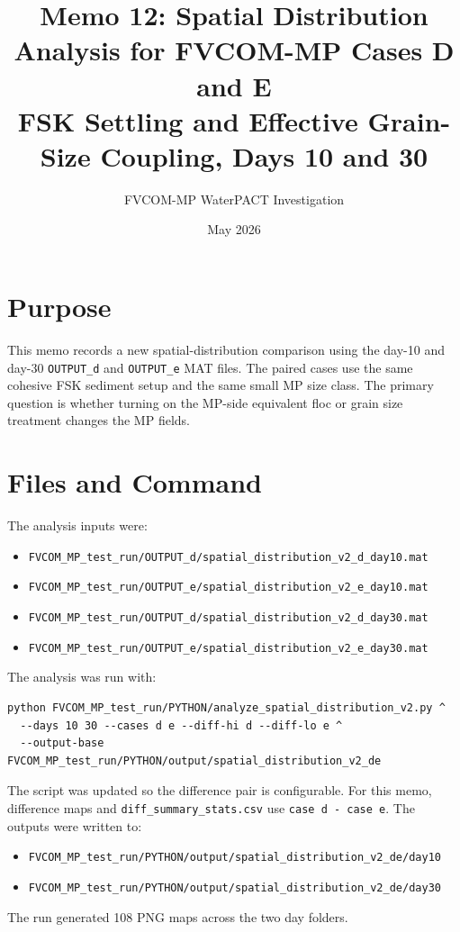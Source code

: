 \documentclass[11pt]{article}
\title{Memo 12: Spatial Distribution Analysis for FVCOM-MP Cases D and E\\
       FSK Settling and Effective Grain-Size Coupling, Days 10 and 30}
\author{FVCOM-MP WaterPACT Investigation}
\date{May 2026}
\begin{document}
\sloppy
\setlength{\tabcolsep}{4pt}
\maketitle

\section*{Purpose}

This memo records a new spatial-distribution comparison using the day-10 and
day-30 \texttt{OUTPUT\_d} and \texttt{OUTPUT\_e} MAT files.  The paired cases
use the same cohesive FSK sediment setup and the same small MP size class.  The
primary question is whether turning on the MP-side equivalent floc or grain
size treatment changes the MP fields.

\section*{Files and Command}

The analysis inputs were:
\begin{itemize}
  \item \texttt{FVCOM\_MP\_test\_run/OUTPUT\_d/spatial\_distribution\_v2\_d\_day10.mat}
  \item \texttt{FVCOM\_MP\_test\_run/OUTPUT\_e/spatial\_distribution\_v2\_e\_day10.mat}
  \item \texttt{FVCOM\_MP\_test\_run/OUTPUT\_d/spatial\_distribution\_v2\_d\_day30.mat}
  \item \texttt{FVCOM\_MP\_test\_run/OUTPUT\_e/spatial\_distribution\_v2\_e\_day30.mat}
\end{itemize}

The analysis was run with:
\begin{verbatim}
python FVCOM_MP_test_run/PYTHON/analyze_spatial_distribution_v2.py ^
  --days 10 30 --cases d e --diff-hi d --diff-lo e ^
  --output-base FVCOM_MP_test_run/PYTHON/output/spatial_distribution_v2_de
\end{verbatim}

The script was updated so the difference pair is configurable.  For this memo,
difference maps and \texttt{diff\_summary\_stats.csv} use
\texttt{case d - case e}.  The outputs were written to:
\begin{itemize}
  \item \texttt{FVCOM\_MP\_test\_run/PYTHON/output/spatial\_distribution\_v2\_de/day10}
  \item \texttt{FVCOM\_MP\_test\_run/PYTHON/output/spatial\_distribution\_v2\_de/day30}
\end{itemize}
The run generated 108 PNG maps across the two day folders.
\end{document}
